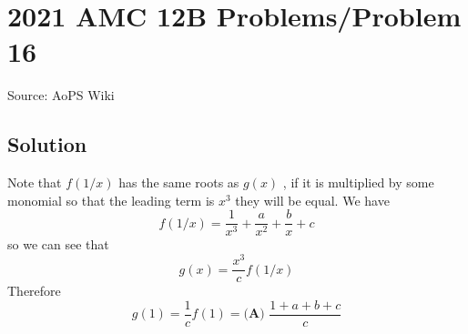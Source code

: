 \documentclass[12pt]{article}
\begin{document}
\section*{{2021 AMC 12B Problems/Problem 16}}
Source: AoPS Wiki

\subsection*{Solution}
Note that $f(1/x)$ has the same roots as $g(x)$ , if it is multiplied by some monomial so that the leading term is $x^3$ they will be equal. We have \[f(1/x) = \frac{1}{x^3} + \frac{a}{x^2}+\frac{b}{x} + c\] so we can see that \[g(x) = \frac{x^3}{c}f(1/x)\] Therefore \[g(1) = \frac{1}{c}f(1) = \boxed{\textbf{(A) }\frac{1+a+b+c}c}\]
\end{document}
